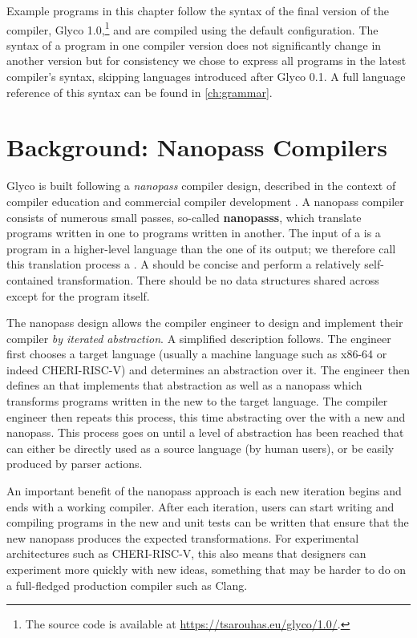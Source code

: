 \documentclass[main.tex]{subfiles}
\begin{document}
Example programs in this chapter follow the syntax of the final version of the compiler, Glyco 1.0,\footnote{The source code is available at \url{https://tsarouhas.eu/glyco/1.0/}.} and are compiled using the default configuration. The syntax of a program in one compiler version does not significantly change in another version but for consistency we chose to express all programs in the latest compiler's syntax, skipping languages introduced after Glyco 0.1. A full language reference of this syntax can be found in \cref{ch:grammar}. 

\section{Background: Nanopass Compilers} \label{sct:nanopass}
Glyco is built following a \emph{nanopass} compiler design, described in the context of compiler education \citep{educomp} and commercial compiler development \citep{commcomp}. A nanopass compiler consists of numerous small passes, so-called \textbf{\glspl{nanopass}}, which translate programs written in one \textbf{} to programs written in another. The input of a  is a program in a higher-level language than the one of its output; we therefore call this translation process a \textbf{}. A  should be concise and perform a relatively self-contained transformation. There should be no data structures shared across  except for the program itself.

The nanopass design allows the compiler engineer to design and implement their compiler \emph{by iterated abstraction}. A simplified description follows. The engineer first chooses a target language (usually a machine language such as x86-64 or indeed CHERI-RISC-V) and determines an abstraction over it. The engineer then defines an  that implements that abstraction as well as a \gls{nanopass} which transforms programs written in the new  to the target language. The compiler engineer then repeats this process, this time abstracting over the  with a new  and \gls{nanopass}. This process goes on until a level of abstraction has been reached that can either be directly used as a source language (by human users), or be easily produced by parser actions.

An important benefit of the nanopass approach is each new iteration begins and ends with a working compiler. After each iteration, users can start writing and compiling programs in the new  and unit tests can be written that ensure that the new \gls{nanopass} produces the expected transformations. For experimental architectures such as CHERI-RISC-V, this also means that designers can experiment more quickly with new ideas, something that may be harder to do on a full-fledged production compiler such as Clang.
\end{document}
